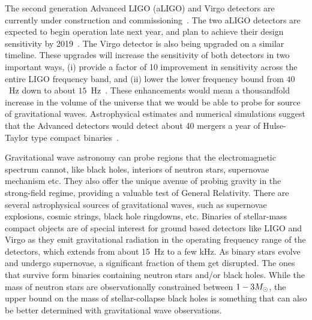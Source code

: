 The second generation Advanced LIGO (aLIGO) and Virgo detectors are currently
under construction and commissioning~\cite{Harry:2010zz,aVIRGO}.
The two aLIGO detectors are expected to begin operation late next year, and
plan to achieve their design sensitivity by 2019~\cite{Aasi:2013wya}. 
The Virgo detector is also being upgraded on a similar timeline. 
These upgrades will increase the sensitivity of both detectors in two 
important ways, (i) provide a factor of 10 improvement in sensitivity 
across the entire LIGO frequency band, and (ii) lower the lower frequency
bound from $40$~Hz down to about $15$~Hz~\cite{Harry:2010zz}. 
These enhancements would mean a thousandfold increase in the volume of the
universe that we would be able to probe for source of gravitational waves. 
Astrophysical estimates and numerical simulations suggest that the Advanced
detectors would detect about 40 mergers a year of Hulse-Taylor type compact
binaries~\cite{LSCCBCRates2010}. 


Gravitational wave astronomy can probe regions that the electromagnetic
spectrum cannot, like black holes, interiors of neutron stars, supernovae
mechanism etc. They also offer the unique avenue of probing gravity in 
the strong-field regime, providing a valuable test of General Relativity.
There are several astrophysical sources of gravitational waves, such as 
supernovae explosions, cosmic strings, black hole ringdowns, etc. 
Binaries of stellar-mass compact objects are of special interest for 
ground based detectors like LIGO and Virgo as they emit gravitational 
radiation in the operating frequency range of the detectors, which
extends from about 15~Hz to a few kHz. As binary stars evolve and 
undergo supernovae, a significant 
fraction of them get disrupted. The ones that survive form binaries
containing neutron stars and/or black holes. While the mass of neutron
stars are observationally constrained between $1-3M_\odot$, the upper bound 
on the mass of stellar-collapse black holes is something that can also 
be better determined with gravitational wave observations. 

